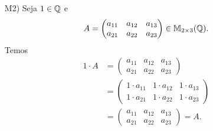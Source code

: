 \begin{exemplo}
\begin{enumerate}[label={\arabic*})]
\begin{solucao}
\begin{itemize}
              \item[M2)] Seja $1 \in \mathbb{Q}$ e
                \[
                  A = \begin{pmatrix} a_{11} & a_{12} & a_{13}\\a_{21} & a_{22} & a_{23}\end{pmatrix} \in \mathbb{M}_{2 \times 3}(\mathbb{Q}).
                \]
                Temos
                \begin{align*}
                  1\cdot A & = \begin{pmatrix} a_{11} & a_{12} & a_{13}\\a_{21} & a_{22} & a_{23}\end{pmatrix}
                  \\ &= \begin{pmatrix} 1\cdot a_{11} & 1\cdot a_{12} & 1\cdot a_{13}\\1\cdot a_{21} & 1\cdot a_{22} & 1\cdot a_{23}\end{pmatrix}
                  \\ &= \begin{pmatrix} a_{11} & a_{12} & a_{13}\\a_{21} & a_{22} & a_{23}\end{pmatrix} = A.
                \end{align*}


\end{itemize}
\end{solucao}
\end{enumerate}
\end{exemplo}
